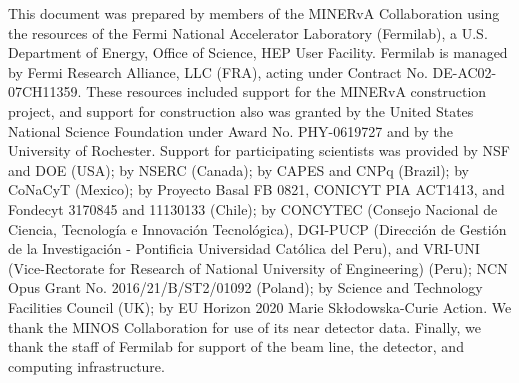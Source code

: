 \documentclass[aps,prl,twocolumn,superscriptaddress,nofootinbib]{revtex4}
\begin{document}
This document was prepared by members of the MINERvA Collaboration using the resources of the Fermi National Accelerator Laboratory (Fermilab), a U.S. Department of Energy, Office of Science, HEP User Facility. Fermilab is managed by Fermi Research Alliance, LLC (FRA), acting under Contract No. DE-AC02-07CH11359. These resources included support for the MINERvA construction project, and support for construction also was granted by the United States National Science Foundation under Award No. PHY-0619727 and by the University of Rochester.  Support for  participating scientists was provided by NSF and DOE (USA); by NSERC (Canada); by CAPES and CNPq (Brazil); by CoNaCyT (Mexico); by Proyecto Basal FB 0821, CONICYT PIA ACT1413, and Fondecyt 3170845 and 11130133 (Chile);  by CONCYTEC (Consejo Nacional de Ciencia, Tecnolog\'ia e Innovaci\'on Tecnol\'ogica), DGI-PUCP (Direcci\'on de Gesti\'on de la Investigaci\'on  - Pontificia Universidad Cat\'olica del Peru), and VRI-UNI (Vice-Rectorate for Research of National University of Engineering) (Peru); NCN Opus Grant No. 2016/21/B/ST2/01092 (Poland); by Science and Technology Facilities Council (UK); by EU Horizon 2020 Marie Skłodowska-Curie Action.  We thank the MINOS Collaboration for use of its near detector data. Finally, we thank the staff of Fermilab for support of the beam line, the detector, and computing infrastructure.
\end{document}
